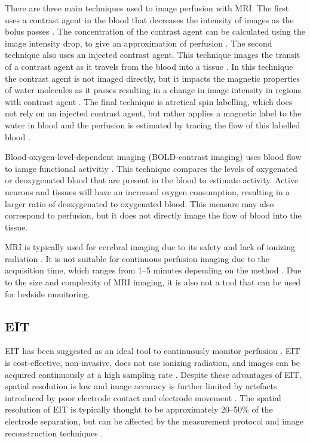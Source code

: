 There are three main techniques used to image perfusion with
MRI. The first uses a contrast agent in the blood that 
decreases the intensity
of  
images as the bolus passes \parencite{jackson_dynamic_2005}.  
The concentration of the contrast agent 
can be calculated using the image intensity drop, to give
an approximation of 
perfusion \parencite{jackson_dynamic_2005}. 
The second technique also uses an injected contrast
agent. This technique images the transit of a contrast agent as it travels 
from the blood into a tissue \parencite{sourbron_classic_2013}. In this technique the contrast
agent is not imaged directly, but it impacts the magnetic properties of 
water molecules as it passes resulting in a change in image intensity in regions 
with contrast agent \parencite{sourbron_classic_2013}. 
The final technique is atretical spin labelling, which does not rely on 
an injected contrast agent, but rather applies a  magnetic label to the water 
in blood and the perfusion is estimated by tracing the flow of this labelled 
blood \parencite{koretsky_early_2012}. 

Blood-oxygen-level-dependent imaging (BOLD-contrast imaging) uses blood flow to 
iamge functional activitiy \parencite{faro_functional_2006}.
This technique compares the levels of oxygenated or deoxygenated blood
that are present in the blood to estimate activity. 
Active neurons and tissues will have an increased oxygen consumption, 
resulting in a larger ratio of deoxygenated to oxygenated blood. 
This measure may also correspond to perfusion, but it does not directly image the 
flow of blood into the tissue.

MRI is typically used for cerebral imaging due to its safety and 
lack of ionizing radiation \parencite{watson_lessons_2015}. It is not suitable for 
continuous perfusion imaging due to the acquisition time, which
ranges from 1--5 minutes depending on the method \parencite{essig_perfusion_2013}.
Due to the size and complexity of MRI imaging, it is also not a tool that can be used
for bedside monitoring.

\subsection{EIT}
EIT has been suggested as an ideal tool to continuously monitor 
perfusion \parencite{leonhardt_electrical_2012}. EIT is cost-effective,
non-invasive, does not use ionizing radiation, and images can be acquired 
continuously at a high sampling rate \parencite{adler_electrical_2017}.
Despite these advantages of EIT, 
spatial resolution is low and image accuracy is further limited by 
artefacts introduced by poor electrode contact and electrode 
movement \parencite{adler_electrical_2017}.
The spatial resolution of EIT is typically thought to be approximately 20--50\% 
of the electrode separation, but can be affected by the measurement protocol 
and image reconstruction techniques \parencite{polydorides_electrode_2002}.


